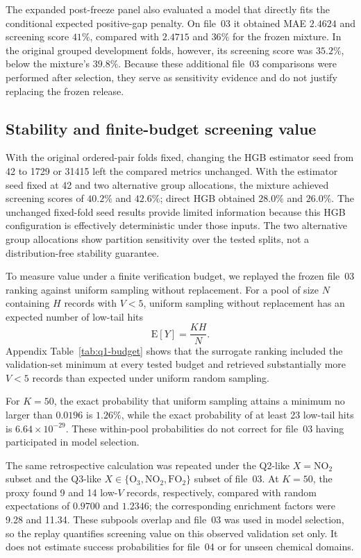 The expanded post-freeze panel also evaluated a model that directly fits
the conditional expected positive-gap penalty.  On file~03 it obtained MAE
$2.4624$ and screening score $41\%$, compared with $2.4715$ and $36\%$ for
the frozen mixture.  In the original grouped development folds, however,
its screening score was $35.2\%$, below the mixture's $39.8\%$.  Because
these additional file~03 comparisons were performed after selection, they
serve as sensitivity evidence and do not justify replacing the frozen
release.

\subsection{Stability and finite-budget screening value}

With the original ordered-pair folds fixed, changing the HGB estimator seed
from 42 to 1729 or 31415 left the compared metrics unchanged.  With the
estimator seed fixed at 42 and two alternative group allocations, the
mixture achieved screening scores of $40.2\%$ and $42.6\%$; direct HGB
obtained $28.0\%$ and $26.0\%$.  The unchanged fixed-fold seed results provide
limited information because this HGB configuration is effectively deterministic
under those inputs.  The two alternative group allocations show partition
sensitivity over the tested splits, not a distribution-free stability guarantee.

To measure value under a finite verification budget, we replayed the frozen
file~03 ranking against uniform sampling without replacement.  For a pool
of size $N$ containing $H$ records with $V<5$, uniform sampling
without replacement has an expected number of low-tail hits
\begin{equation}
  \mathrm{E}[Y]=\frac{KH}{N}.
  \label{eq:q1-random-hits}
\end{equation}
Appendix Table~\ref{tab:q1-budget} shows that the surrogate ranking included
the validation-set minimum at every tested budget and retrieved substantially
more $V<5$ records than expected under uniform random sampling.

For $K=50$, the exact probability that uniform sampling attains a minimum no
larger than $0.0196$ is $1.26\%$, while the exact probability of at least 23
low-tail hits is $6.64\times10^{-29}$.  These within-pool probabilities do not
correct for file~03 having participated in model selection.

The same retrospective calculation was repeated under the Q2-like
$X=\mathrm{NO}_2$ subset and the Q3-like
$X\in\{\mathrm{O}_3,\mathrm{NO}_2,\mathrm{FO}_2\}$ subset of file~03.  At
$K=50$, the proxy found 9 and 14 low-$V$ records, respectively, compared
with random expectations of $0.9700$ and $1.2346$; the corresponding
enrichment factors were 9.28 and 11.34.  These subpools overlap and file~03
was used in model selection, so the replay quantifies screening value on
this observed validation set only.  It does not estimate success
probabilities for file~04 or for unseen chemical domains.


